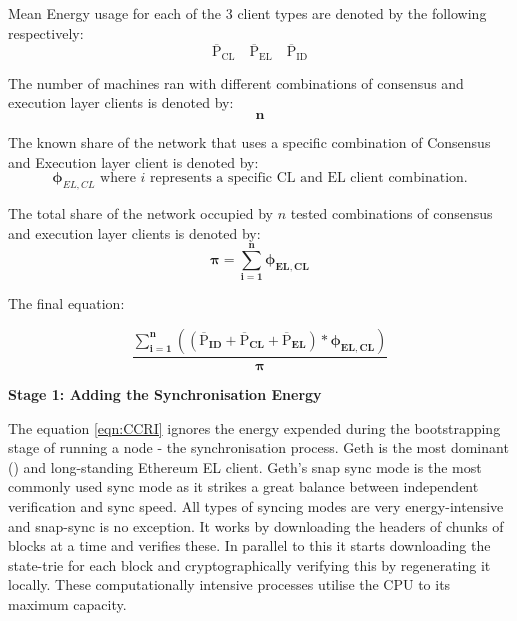 Mean Energy usage for each of the 3 client types are denoted by the following respectively: 
\begin{equation*}
  \boldsymbol{\mathrm{{\overline{P}}_{CL}}}\quad      \boldsymbol{\mathrm{{\overline{P}}_{EL}}}\quad  \boldsymbol{\mathrm{{\overline{P}}_{ID}}}   
\end{equation*}

The number of machines ran with different combinations of consensus and execution layer clients is denoted by:
\begin{equation*}
    \boldsymbol{n}
\end{equation*}

The known share of the network that uses a specific combination of Consensus and Execution layer client is denoted by:
\begin{equation*}
    \boldsymbol{\phi}_{EL,CL} \text{ where } {i} \text{ represents a specific CL and EL client combination.}
\end{equation*}

The total share of the network occupied by ${n}$ tested combinations of consensus and execution layer clients is denoted by:
\begin{equation*}
    \boldsymbol{{\pi} = \displaystyle\sum\limits_{i=1}^{n}{\phi_{EL,CL}}}
\end{equation*}

The final equation: 

\begin{equation}
\boldsymbol{\frac{\displaystyle\sum\limits_{i=1}^{n}{ \left({\left(\mathrm{\overline{P}}_{ID} + \mathrm{\overline{P}}_{CL} + \mathrm{\overline{P}}_{EL}\right)} * {\phi_{EL,CL}} \right)}}
 {\pi}}\label{eqn:CCRI}
\end{equation}



\textbf{Stage 1: Adding the Synchronisation Energy} 

 The equation \ref{eqn:CCRI} ignores the energy expended during the bootstrapping stage of running a node - the synchronisation process. Geth is the most dominant () and long-standing Ethereum EL client. Geth's snap sync mode is the most commonly used sync mode as it strikes a great balance between independent verification and sync speed.
 All types of syncing modes are very energy-intensive and snap-sync is no exception. It works by downloading the headers of chunks of blocks at a time and verifies these. In parallel to this it starts downloading the state-trie for each block and cryptographically verifying this by regenerating it locally. These computationally intensive processes utilise the CPU to its maximum capacity.

